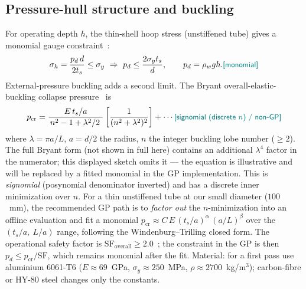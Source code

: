 \documentclass{new-aiaa}
\newcommand{\gpc}[1]{\textcolor{teal}{\small\textsf{[#1]}}} %
\begin{document}
\subsection{Pressure-hull structure and buckling}\label{sec:structure}
For operating depth $h$, the thin-shell hoop stress (unstiffened tube) gives a monomial gauge
constraint~\cite{shinoka2024structural}:
\begin{equation}
\sigma_h = \frac{p_d\, d}{2 t_s} \le \sigma_y \ \Rightarrow\
p_d \le \frac{2\sigma_y t_s}{d},
\qquad p_d = \rho_w g h. \gpc{monomial}
\end{equation}
External-pressure buckling adds a second limit. The Bryant overall-elastic-buckling collapse
pressure~\cite{shinoka2024structural} is
\begin{equation}
p_{\text{cr}} = \frac{E\,t_s/a}{\,n^2-1+\lambda^2/2\ }
                \left[\frac{1}{(n^2+ \lambda^2)^2}\right] + \cdots
                \gpc{signomial (discrete $n$) / non-GP}
\end{equation}
where $\lambda=\pi a/L$, $a=d/2$ the radius, $n$ the integer buckling lobe number ($\ge2$).
The full Bryant form (not shown in full here) contains an additional $\lambda^4$ factor in the
numerator; this displayed sketch omits it — the equation is illustrative and will be replaced by a
fitted monomial in the GP implementation.
This is \emph{signomial} (posynomial denominator inverted) and has a discrete inner minimization over
$n$. For a thin unstiffened tube at our small diameter ($100$~mm), the recommended GP path is to
\emph{factor out} the $n$-minimization into an offline evaluation and fit a monomial
$p_{\text{cr}} \approx C\,E\,(t_s/a)^\alpha\,(a/L)^\beta$ over the $(t_s/a,\ L/a)$ range,
following the Windenburg--Trilling closed form. The operational safety factor is
$\mathrm{SF}_{\text{overall}}\ge2.0$~\cite{shinoka2024structural}; the constraint in the GP is
then $p_d \le p_{\text{cr}}/\mathrm{SF}$, which remains monomial after the fit.
Material: for a first pass use aluminium 6061-T6 ($E\approx69$~GPa, $\sigma_y\approx 250$~MPa,
$\rho\approx2700$~kg/m$^3$); carbon-fibre or HY-80 steel changes only the constants.
\end{document}
